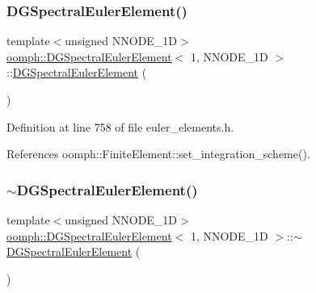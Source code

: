 \subsubsection{\texorpdfstring{D\+G\+Spectral\+Euler\+Element()}{DGSpectralEulerElement()}}
{\footnotesize\ttfamily template$<$unsigned N\+N\+O\+D\+E\+\_\+1D$>$ \\
\hyperlink{classoomph_1_1DGSpectralEulerElement}{oomph\+::\+D\+G\+Spectral\+Euler\+Element}$<$ 1, N\+N\+O\+D\+E\+\_\+1D $>$\+::\hyperlink{classoomph_1_1DGSpectralEulerElement}{D\+G\+Spectral\+Euler\+Element} (\begin{DoxyParamCaption}{ }\end{DoxyParamCaption})\hspace{0.3cm}{\ttfamily [inline]}}



Definition at line 758 of file euler\+\_\+elements.\+h.



References oomph\+::\+Finite\+Element\+::set\+\_\+integration\+\_\+scheme().

\mbox{\label{classoomph_1_1DGSpectralEulerElement_3_011_00_01NNODE__1D_01_4_afd1bee839d39cfb1f513d041b75d4c16}} 
\subsubsection{\texorpdfstring{$\sim$\+D\+G\+Spectral\+Euler\+Element()}{~DGSpectralEulerElement()}}
{\footnotesize\ttfamily template$<$unsigned N\+N\+O\+D\+E\+\_\+1D$>$ \\
\hyperlink{classoomph_1_1DGSpectralEulerElement}{oomph\+::\+D\+G\+Spectral\+Euler\+Element}$<$ 1, N\+N\+O\+D\+E\+\_\+1D $>$\+::$\sim$\hyperlink{classoomph_1_1DGSpectralEulerElement}{D\+G\+Spectral\+Euler\+Element} (\begin{DoxyParamCaption}{ }\end{DoxyParamCaption})\hspace{0.3cm}{\ttfamily [inline]}}



